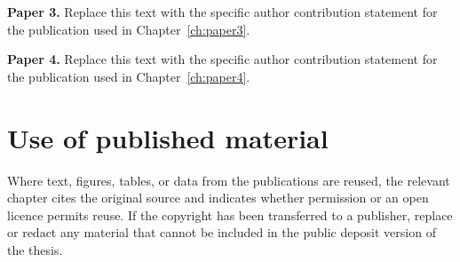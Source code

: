 \textbf{Paper 3.} Replace this text with the specific author contribution statement for the publication used in Chapter~\ref{ch:paper3}.

\textbf{Paper 4.} Replace this text with the specific author contribution statement for the publication used in Chapter~\ref{ch:paper4}.

\section*{Use of published material}

Where text, figures, tables, or data from the publications are reused, the relevant chapter cites the original source and indicates whether permission or an open licence permits reuse. If the copyright has been transferred to a publisher, replace or redact any material that cannot be included in the public deposit version of the thesis.
